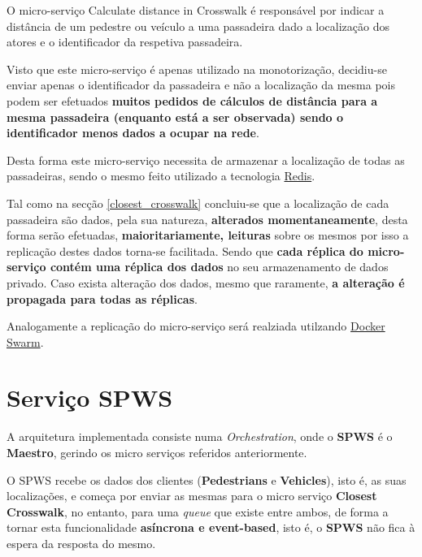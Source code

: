 \documentclass[acmsmall,nonacm,screen]{acmart}
\begin{document}
\hspace{5mm} O micro-serviço Calculate distance in Crosswalk é responsável por indicar a distância de um pedestre ou veículo a uma passadeira dado a localização dos atores e o identificador da respetiva passadeira.

\hspace{5mm} Visto que este micro-serviço é apenas utilizado na monotorização, decidiu-se enviar apenas o identificador da passadeira e não a localização da mesma pois podem ser efetuados \textbf{muitos pedidos de cálculos de distância para a mesma passadeira (enquanto está a ser observada) sendo o identificador menos dados a ocupar na rede}.

\hspace{5mm} Desta forma este micro-serviço necessita de armazenar a localização de todas as passadeiras, sendo o mesmo feito utilizado a tecnologia \href{https://redis.io/}{Redis}. 

\hspace{5mm} Tal como na secção \ref{closest_crosswalk} concluiu-se que a localização de cada passadeira são dados, pela sua natureza, \textbf{alterados momentaneamente}, desta forma serão efetuadas, \textbf{maioritariamente, leituras} sobre os mesmos por isso a replicação destes dados torna-se facilitada. Sendo que \textbf{cada réplica do micro-serviço contém uma réplica dos dados} no seu armazenamento de dados privado. Caso exista alteração dos dados, mesmo que raramente, \textbf{a alteração é propagada para todas as réplicas}.

\hspace{5mm} Analogamente a replicação do micro-serviço será realziada utilzando \href{https://docs.docker.com/engine/swarm/}{Docker Swarm}.


\section{Serviço SPWS}
\hspace{5mm} A arquitetura implementada consiste numa \textit{Orchestration}, onde o \textbf{SPWS} é o \textbf{Maestro}, gerindo os micro serviços referidos anteriormente.

\hspace{5mm} O SPWS recebe os dados dos clientes (\textbf{Pedestrians} e \textbf{Vehicles}), isto é, as suas localizações, e começa por enviar as mesmas para o micro serviço \textbf{Closest Crosswalk}, no entanto, para uma \textit{queue} que existe entre ambos, de forma a tornar esta funcionalidade \textbf{asíncrona e event-based}, isto é, o \textbf{SPWS} não fica à espera da resposta do mesmo. 
\end{document}
